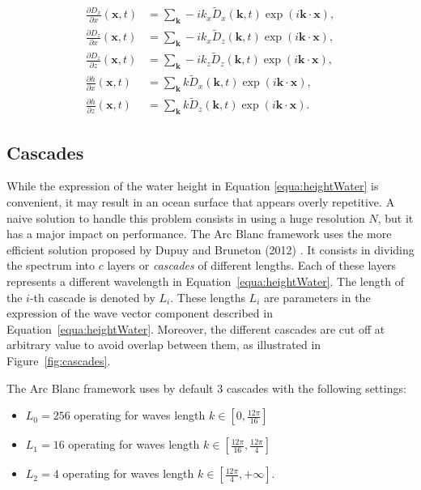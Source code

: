 \documentclass[final]{jcgt}
\def\Framework{The Arc Blanc framework\xspace}
\begin{document}
\begin{align*}
	\frac{\partial D_x}{\partial x}(\mathbf x,t) & = \sum_{\mathbf{k}} -ik_x \tilde{D}_x(\mathbf k,t)\exp\left(i\mathbf{k}\cdot\mathbf x\right),  \\
	\frac{\partial D_z}{\partial x}(\mathbf x,t) & = \sum_{\mathbf{k}} -ik_x \tilde{D}_z(\mathbf k,t)\exp\left( i \mathbf{k}\cdot \mathbf x\right), \\
	\frac{\partial D_z}{\partial z}(\mathbf x,t) & = \sum_{\mathbf{k}} -ik_z\tilde{D}_z(\mathbf k,t)\exp\left( i \mathbf{k}\cdot \mathbf x\right),  \\
	\frac{\partial h}{\partial x}(\mathbf x,t)   & = \sum_{\mathbf{k}} k \tilde{D}_x(\mathbf k,t)\exp\left( i \mathbf{k}\cdot \mathbf x\right),              \\
	\frac{\partial h}{\partial z}(\mathbf x,t)   & = \sum_{\mathbf{k}} k \tilde{D}_z(\mathbf k,t)\exp\left( i \mathbf{k}\cdot \mathbf x\right).
\end{align*}

\subsection{Cascades}
\label{subsec:cascades}
While the expression of the water height in Equation \ref{equa:heightWater} is convenient, it may result in an ocean surface that appears overly repetitive.
A naive solution to handle this problem consists in using a huge resolution $N$, but it has a major impact on performance.
\Framework uses the more efficient solution proposed by Dupuy and Bruneton (2012) \cite{dupuyRealtimeAnimationRendering2012}.
It consists in dividing the spectrum into $c$ layers or \emph{cascades} of different lengths.
Each of these layers represents a different wavelength in Equation~\ref{equa:heightWater}.
The length of the $i$-th cascade is denoted by $L_i$.
These lengths $L_i$ are parameters in the expression of the wave vector component described in Equation~\ref{equa:heightWater}.
Moreover, the different cascades are cut off at arbitrary value to avoid overlap between them, as illustrated in Figure~\ref{fig:cascades}.

\Framework uses by default $3$ cascades with the following settings:
\begin{itemize}
	\item $L_0 = 256$ operating for waves length $k\in [0,\frac{12\pi}{16}]$
	\item $L_1 = 16$ operating for waves length $k\in [\frac{12\pi}{16},\frac{12\pi}{4}]$
	\item $L_2 = 4$ operating for waves length $k\in [\frac{12\pi}{4},+\infty]$.
\end{itemize}
\end{document}
